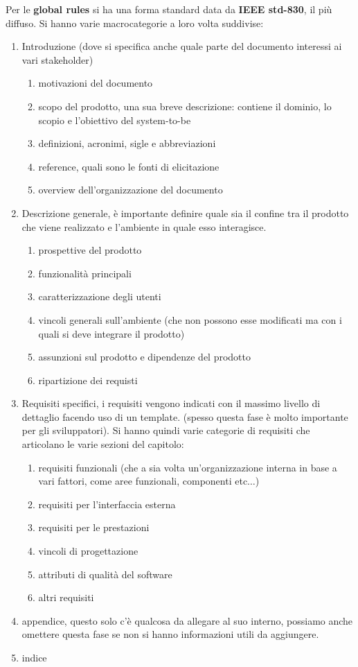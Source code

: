 Per le \textbf{global rules} si ha una forma standard data da \textbf{IEEE std-830}, il più diffuso. Si hanno varie macrocategorie a loro volta suddivise:
\begin{enumerate}
  \item Introduzione (dove si specifica anche quale parte del documento interessi ai vari stakeholder)
  \begin{enumerate}
    \item motivazioni del documento
    \item scopo del prodotto, una sua breve descrizione: contiene il dominio, lo scopio e l'obiettivo del system-to-be
    \item definizioni, acronimi, sigle e abbreviazioni
    \item reference, quali sono le fonti di elicitazione
    \item overview dell'organizzazione del documento
  \end{enumerate}
  \item Descrizione generale, è importante definire quale sia il confine tra il prodotto che viene realizzato e l'ambiente in quale esso interagisce. 
  \begin{enumerate}
    \item prospettive del prodotto
    \item funzionalità principali
    \item caratterizzazione degli utenti
    \item vincoli generali sull'ambiente (che non possono esse modificati ma con i quali si deve integrare il prodotto)
    \item assunzioni sul prodotto e dipendenze del prodotto
    \item ripartizione dei requisti
  \end{enumerate}
  \item Requisiti specifici, i requisiti vengono indicati con il massimo livello di dettaglio facendo uso di un template. (spesso questa fase è molto importante per gli sviluppatori). Si hanno quindi varie categorie di requisiti che articolano le varie sezioni del capitolo:
  \begin{enumerate}
    \item requisiti funzionali (che a sia volta un'organizzazione interna in base a vari fattori, come aree funzionali, componenti etc$\ldots$)
    \item requisiti per l'interfaccia esterna
    \item requisiti per le prestazioni
    \item vincoli di progettazione
    \item attributi di qualità del software
    \item altri requisiti
  \end{enumerate}
  \item appendice, questo solo c'è qualcosa da allegare al suo interno, possiamo anche omettere questa fase se non si hanno informazioni utili da aggiungere.
  \item indice
\end{enumerate}

